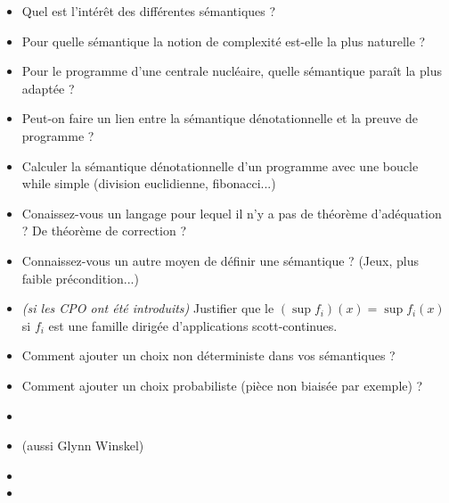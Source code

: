 \documentclass{article}
\begin{document}
\begin{itemize}
    \item Quel est l'intérêt des différentes sémantiques ?
    \item Pour quelle sémantique la notion de complexité est-elle 
        la plus naturelle ?
    \item Pour le programme d'une centrale nucléaire, quelle sémantique 
        paraît la plus adaptée ?
    \item Peut-on faire un lien entre la sémantique dénotationnelle
        et la preuve de programme ?
    \item Calculer la sémantique dénotationnelle d'un programme 
        avec une boucle while simple (division euclidienne, fibonacci...)
    \item Conaissez-vous un langage pour lequel il n'y a pas 
        de théorème d'adéquation ? De théorème de correction ?
    \item Connaissez-vous un autre moyen de définir une sémantique ?
        (Jeux, plus faible précondition...)
    \item \emph{(si les CPO ont été introduits)}
        Justifier que le $(\sup f_i) (x) = \sup f_i (x)$
        si $f_i$ est une famille dirigée d'applications 
        scott-continues.
    \item Comment ajouter un choix non déterministe dans 
        vos sémantiques ?
    \item Comment ajouter un choix probabiliste (pièce non biaisée par exemple)
        ?
\end{itemize}

\secreferences

\begin{itemize}
\item {}
\item {}
    (aussi Glynn Winskel)
\end{itemize}

\secdev

\begin{itemize}
\item {}
\item {}
\end{itemize}
\end{document}
